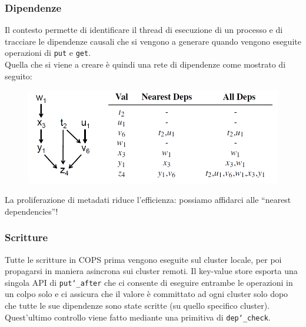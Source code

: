 
\begin{frame}
\frametitle{Dipendenze}
Il contesto permette di identificare il thread di esecuzione di un processo e
di tracciare le dipendenze causali che si vengono a generare quando vengono
eseguite operazioni di \texttt{put} e \texttt{get}. \\
Quella che si viene a creare è quindi una rete di dipendenze come mostrato di seguito:
\begin{figure}
	\centering
	\includegraphics[scale=0.35]{COPS/COPS4.png}
\end{figure}
La proliferazione di metadati riduce l'efficienza: possiamo affidarci
alle ``nearest dependencies''!
\end{frame}

\begin{frame}
\frametitle{Scritture}
Tutte le scritture in COPS prima vengono eseguite sul cluster locale, per poi propagarsi
in maniera asincrona sui cluster remoti. Il key-value store esporta una singola API
di \texttt{put\char`_after} che ci consente di eseguire entrambe le operazioni in un 
colpo solo e ci assicura che il valore è committato ad ogni cluster solo dopo che tutte
le sue dipendenze sono state scritte (su quello specifico cluster). Quest'ultimo controllo
viene fatto mediante una primitiva di \texttt{dep\char`_check}.
\end{frame}

